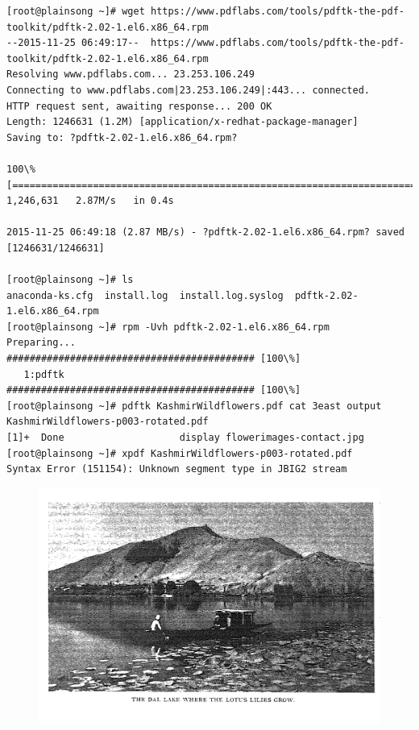 \documentclass[10pt]{article}
\begin{document}
\begin{Verbatim}[fontsize=\scriptsize]
[root@plainsong ~]# wget https://www.pdflabs.com/tools/pdftk-the-pdf-toolkit/pdftk-2.02-1.el6.x86_64.rpm
--2015-11-25 06:49:17--  https://www.pdflabs.com/tools/pdftk-the-pdf-toolkit/pdftk-2.02-1.el6.x86_64.rpm
Resolving www.pdflabs.com... 23.253.106.249
Connecting to www.pdflabs.com|23.253.106.249|:443... connected.
HTTP request sent, awaiting response... 200 OK
Length: 1246631 (1.2M) [application/x-redhat-package-manager]
Saving to: ?pdftk-2.02-1.el6.x86_64.rpm?

100\%[==================================================================================================================================================================>] 1,246,631   2.87M/s   in 0.4s    

2015-11-25 06:49:18 (2.87 MB/s) - ?pdftk-2.02-1.el6.x86_64.rpm? saved [1246631/1246631]

[root@plainsong ~]# ls
anaconda-ks.cfg  install.log  install.log.syslog  pdftk-2.02-1.el6.x86_64.rpm
[root@plainsong ~]# rpm -Uvh pdftk-2.02-1.el6.x86_64.rpm 
Preparing...                ########################################### [100\%]
   1:pdftk                  ########################################### [100\%]
[root@plainsong ~]# pdftk KashmirWildflowers.pdf cat 3east output KashmirWildflowers-p003-rotated.pdf
[1]+  Done                    display flowerimages-contact.jpg
[root@plainsong ~]# xpdf KashmirWildflowers-p003-rotated.pdf 
Syntax Error (151154): Unknown segment type in JBIG2 stream
\end{Verbatim}
\begin{figure}[!h]
\includegraphics[scale=0.37]{rotated_pic.png}
\centering
\end{figure}
\end{document}
